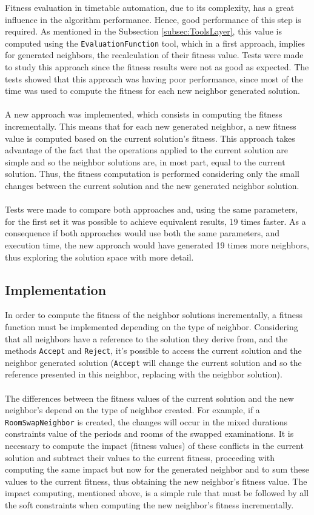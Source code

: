 Fitness evaluation in timetable automation, due to its complexity, has a great influence in the algorithm performance. Hence, good performance of this step is required. As mentioned in the Subsection \ref{subsec:ToolsLayer}, this value is computed using the \verb+EvaluationFunction+ tool, which in a first approach, implies for generated neighbors, the recalculation of their fitness value. Tests were made to study this approach since the fitness results were not as good as expected. The tests showed that this approach was having poor performance, since most of the time was used to compute the fitness for each new neighbor generated solution.\\
\\
A new approach was implemented, which consists in computing the fitness incrementally. This means that for each new generated neighbor, a new fitness value is computed based on the current solution's fitness. This approach takes advantage of the fact that the operations applied to the current solution are simple and so the neighbor solutions are, in most part, equal to the current solution. Thus, the fitness computation is performed considering only the small changes between the current solution and the new generated neighbor solution.\\
\\
Tests were made to compare both approaches and, using the same parameters, for the first set it was possible to achieve equivalent results, 19 times faster. As a consequence if both approaches would use both the same parameters, and execution time, the new approach would have generated 19 times more neighbors, thus exploring the solution space with more detail.

\subsection{Implementation}

In order to compute the fitness of the neighbor solutions incrementally, a fitness function must be implemented depending on the type of neighbor. Considering that all neighbors have a reference to the solution they derive from, and the methods \verb+Accept+ and \verb+Reject+, it's possible to access the current solution and the neighbor generated solution (\verb+Accept+ will change the current solution and so the reference presented in this neighbor, replacing with the neighbor solution). \\
\\
The differences between the fitness values of the current solution and the new neighbor's depend on the type of neighbor created. For example, if a \verb+RoomSwapNeighbor+ is created, the changes will occur in the mixed durations constraints value of the periods and rooms of the swapped examinations. It is necessary to compute the impact (fitness values) of these conflicts in the current solution and subtract their values to the current fitness, proceeding with computing the same impact but now for the generated neighbor and to sum these values to the current fitness, thus obtaining the new neighbor's fitness value. The impact computing, mentioned above, is a simple rule that must be followed by all the soft constraints when computing the new neighbor's fitness incrementally.